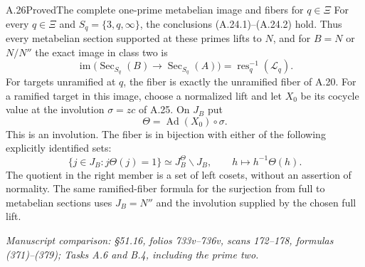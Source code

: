\begin{statement}{A.26}{Proved}{The complete one-prime metabelian image and fibers for $q\in\Xi$}
For every $q\in\Xi$ and $S_q=\{3,q,\infty\}$,
the conclusions (A.24.1)--(A.24.2) hold. Thus every
metabelian section supported at these primes lifts
to $N$, and for $B=N$ or $N/N''$ the exact image
in class two is
\[
 \operatorname{im}\bigl(\operatorname{Sec}_{S_q}(B)
                  \to\operatorname{Sec}_{S_q}(A)\bigr)
       =\operatorname{res}_q^{-1}(\mathscr L_q).
 \tag{A.26.1}
\]
For targets unramified at $q$, the fiber is exactly
the unramified fiber of A.20. For a ramified target
in this image, choose a normalized lift and let
$X_0$ be its cocycle value at the involution
$\sigma=zc$ of A.25. On $J_B$ put
\[
                     \Theta=\operatorname{Ad}(X_0)\circ\sigma.
\]
This is an involution. The fiber is in bijection
with either of the following explicitly identified
sets:
\[
 \{j\in J_B:j\Theta(j)=1\}
       \simeq J_B^{\Theta}\backslash J_B,
 \qquad h\longmapsto h^{-1}\Theta(h).
 \tag{A.26.2}
\]
The quotient in the right member is a set of left
cosets, without an assertion of normality. The same
ramified-fiber formula for the surjection from full
to metabelian sections uses $J_B=N''$ and the
involution supplied by the chosen full lift.
\par\smallskip\noindent\emph{Manuscript comparison: \S51.16,
folios 733v--736v, scans 172--178, formulas (371)--(379);
Tasks A.6 and B.4, including the prime two.}
\end{statement}

